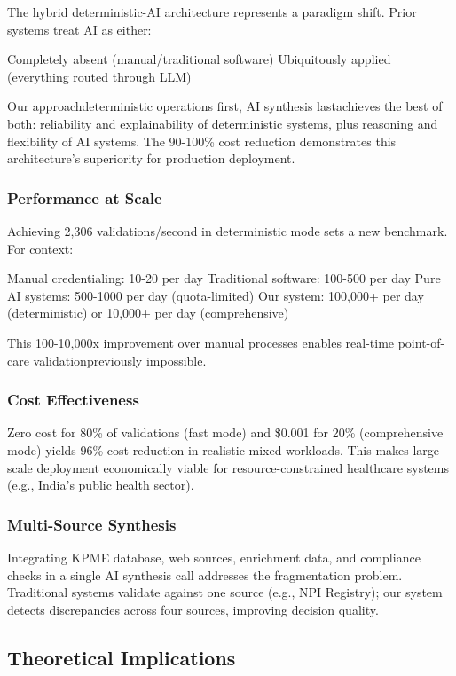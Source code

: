 \documentclass[conference]{IEEEtran}
\begin{document}
The hybrid deterministic-AI architecture represents a paradigm shift. Prior systems treat AI as either:

Completely absent (manual/traditional software)
Ubiquitously applied (everything routed through LLM)

Our approachdeterministic operations first, AI synthesis lastachieves the best of both: reliability and explainability of deterministic systems, plus reasoning and flexibility of AI systems. The 90-100\% cost reduction demonstrates this architecture's superiority for production deployment.

\subsubsection{Performance at Scale}

Achieving 2,306 validations/second in deterministic mode sets a new benchmark. For context:

Manual credentialing: 10-20 per day
Traditional software: 100-500 per day
Pure AI systems: 500-1000 per day (quota-limited)
Our system: 100,000+ per day (deterministic) or 10,000+ per day (comprehensive)

This 100-10,000x improvement over manual processes enables real-time point-of-care validationpreviously impossible.

\subsubsection{Cost Effectiveness}

Zero cost for 80\% of validations (fast mode) and \$0.001 for 20\% (comprehensive mode) yields 96\% cost reduction in realistic mixed workloads. This makes large-scale deployment economically viable for resource-constrained healthcare systems (e.g., India's public health sector).

\subsubsection{Multi-Source Synthesis}

Integrating KPME database, web sources, enrichment data, and compliance checks in a single AI synthesis call addresses the fragmentation problem. Traditional systems validate against one source (e.g., NPI Registry); our system detects discrepancies across four sources, improving decision quality.

\subsection{Theoretical Implications}
\end{document}
